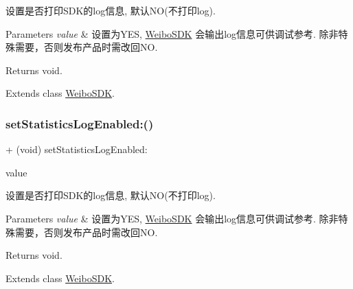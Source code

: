 设置是否打印\+S\+D\+K的log信息, 默认\+NO(不打印log). 
\begin{DoxyParams}{Parameters}
{\em value} & 设置为\+Y\+ES, \mbox{\hyperlink{interface_weibo_s_d_k}{Weibo\+S\+DK}} 会输出log信息可供调试参考. 除非特殊需要，否则发布产品时需改回\+NO. \\
\hline
\end{DoxyParams}
\begin{DoxyReturn}{Returns}
void. 
\end{DoxyReturn}


Extends class \mbox{\hyperlink{interface_weibo_s_d_k_a2e009db32a6d059ff53e35ac211d57f9}{Weibo\+S\+DK}}.

\mbox{\label{category_weibo_s_d_k_07_statistics_08_a2e009db32a6d059ff53e35ac211d57f9}} 
\subsubsection{\texorpdfstring{set\+Statistics\+Log\+Enabled\+:()}{setStatisticsLogEnabled:()}\hspace{0.1cm}{\footnotesize\ttfamily [2/3]}}
{\footnotesize\ttfamily + (void) set\+Statistics\+Log\+Enabled\+: \begin{DoxyParamCaption}\item[{(B\+O\+OL)}]{value }\end{DoxyParamCaption}}

设置是否打印\+S\+D\+K的log信息, 默认\+NO(不打印log). 
\begin{DoxyParams}{Parameters}
{\em value} & 设置为\+Y\+ES, \mbox{\hyperlink{interface_weibo_s_d_k}{Weibo\+S\+DK}} 会输出log信息可供调试参考. 除非特殊需要，否则发布产品时需改回\+NO. \\
\hline
\end{DoxyParams}
\begin{DoxyReturn}{Returns}
void. 
\end{DoxyReturn}


Extends class \mbox{\hyperlink{interface_weibo_s_d_k_a2e009db32a6d059ff53e35ac211d57f9}{Weibo\+S\+DK}}.

\mbox{\label{category_weibo_s_d_k_07_statistics_08_a2e009db32a6d059ff53e35ac211d57f9}} 
